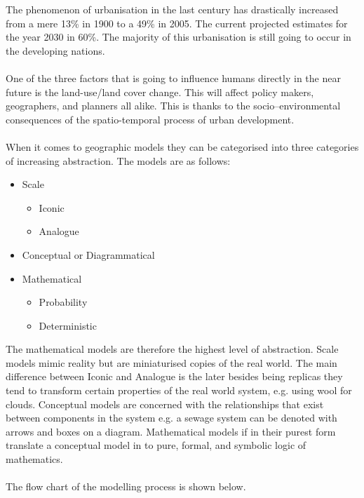 The phenomenon of urbanisation in the last century has drastically increased from a mere 13\% in 1900 to a 49\% in 2005. The current projected estimates for the year 2030 in 60\%. The majority of this urbanisation is still going to occur in the developing nations.\citep{un2005}\\\\
One of the three factors that is going to influence humans directly in the near future is the land-use/land cover change. This will affect policy makers, geographers, and planners all alike. This is thanks to the socio–environmental consequences of the spatio-temporal process of urban development.\citep{vitousek1994beyond,liu2008modelling}\\\\
When it comes to geographic models they can be categorised into three categories of increasing abstraction.\citep{thomas1980modelling} The models are as follows:
\begin{itemize}
\item Scale
\begin{itemize}
\item Iconic
\item Analogue
\end{itemize}
\item Conceptual or Diagrammatical
\item Mathematical
\begin{itemize}
\item Probability
\item Deterministic 
\end{itemize}
\end{itemize}
The mathematical models are therefore the highest level of abstraction. Scale models mimic reality but are miniaturised copies of the real world. The main difference between Iconic and Analogue is the later besides being replicas they tend to transform certain properties of the real world system, e.g. using wool for clouds. Conceptual models are concerned with the relationships that exist between components in the system e.g. a sewage system can be denoted with arrows and boxes on a diagram. Mathematical models if in their purest form translate a conceptual model in to pure, formal, and symbolic logic of mathematics.\citep{thomas1980modelling}\\\\
The flow chart of the modelling process is shown below.
